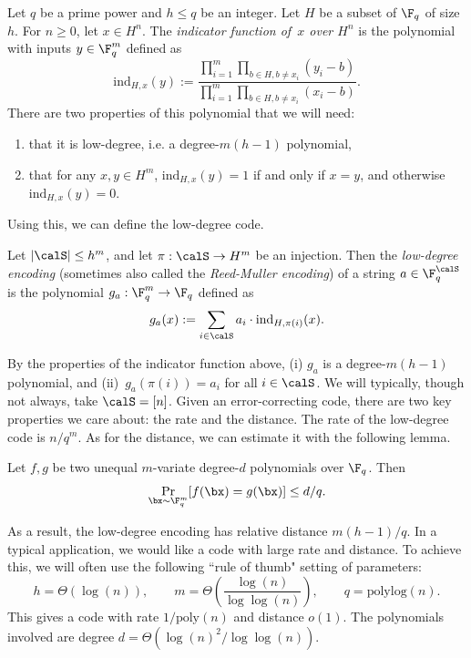 \documentclass[11pt]{article}
\newcommand{\indicator}[3]{\mathrm{ind}_{#1,#2}(#3)}
\begin{document}
Let $q$ be a prime power and $h\leq q$ be an integer.  
Let $H$ be a subset of $\F_q$ of size~$h$.
For $n \geq 0$, let $x \in H^n$.
The \emph{indicator function of~$x$ over $H^n$}
is the polynomial with inputs $y \in \F_q^m$ defined as
\begin{equation*}
\indicator{H}{x}{y} := \frac{\prod_{i=1}^m \prod_{b \in H, b \neq x_i}
  (y_i - b)}{\prod_{i=1}^m \prod_{b \in H, b \neq x_i} (x_i - b)}.
\end{equation*}
There are two properties of this polynomial that we will need:
\begin{enumerate}
\itemsep -.5pt
\item[(i)] that it is low-degree, i.e. a degree-$m(h-1)$ polynomial,
\item[(ii)] that for any $x, y \in H^m$, $\indicator{H}{x}{y} = 1$ if and only if $x = y$,
and otherwise $\indicator{H}{x}{y}= 0$.
\end{enumerate}
Using this, we can define the low-degree code.

\begin{definition}
Let $|\calS| \leq h^m$, and let $\pi:\calS \rightarrow H^m$ be an injection.
Then the \emph{low-degree encoding} (sometimes also called the \emph{Reed-Muller encoding})
of a string $a \in \F_q^{\calS}$ is the polynomial $g_a :\F_q^m \rightarrow \F_q$ defined as
\begin{equation*}
g_a(x) := \sum_{i\in\calS} a_i \cdot \indicator{H}{\pi(i)}{x}.
\end{equation*}
\end{definition}
By the properties of the indicator function above,
(i) $g_a$ is a degree-$m(h-1)$ polynomial,
and (ii)~$g_a(\pi(i)) = a_i$ for all $i \in \calS$.
We will typically, though not always, take $\calS = [n]$.
Given an error-correcting code, there are two key properties we care about:
the rate and the distance.
The rate of the low-degree code is $n / q^m$.
As for the distance, we can estimate it with the following lemma.

\begin{lemma}\label{lem:schwartz-zippel}
Let $f, g$ be two unequal $m$-variate degree-$d$ polynomials over $\F_q$. Then
\begin{equation*}
\Pr_{\bx \sim \F_q^m}[f(\bx) = g(\bx)] \leq d/q.
\end{equation*}
\end{lemma}
As a result, the low-degree encoding has relative distance $m(h-1) / q$.
In a typical application, we would like a code with large rate and distance.
To achieve this, we will often use the following ``rule of thumb" setting of parameters:
\begin{equation}\label{eq:parameters}
h = \Theta(\log(n)),
\qquad
m = \Theta\left(\frac{\log(n)}{\log\log(n)}\right),
\qquad
q = \mathrm{polylog}(n).
\end{equation}
This gives a code with rate $1/\mathrm{poly}(n)$ and distance $o(1)$.
The polynomials involved are degree $d = \Theta(\log(n)^2/\log\log(n))$.
\end{document}
